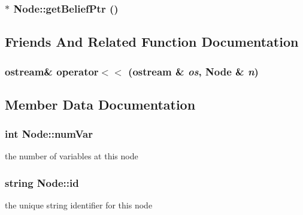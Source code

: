 \subsubsection{$\ast$ Node::getBeliefPtr ()\hspace{0.3cm}{\tt  [inline]}}\label{classNode_f7a5e8b045a32c6468ca6d4f3a9233c7}




\subsection{Friends And Related Function Documentation}
\subsubsection{\setlength{\rightskip}{0pt plus 5cm}ostream\& operator$<$$<$ (ostream \& {\em os}, {\bf Node} \& {\em n})\hspace{0.3cm}{\tt  [friend]}}\label{classNode_c32ccdb39e5e9cd9f0b919638e049adc}




\subsection{Member Data Documentation}
\subsubsection{\setlength{\rightskip}{0pt plus 5cm}int {\bf Node::numVar}\hspace{0.3cm}{\tt  [private]}}\label{classNode_109775531a437cf6f1fa6aa040c8623c}


the number of variables at this node 

\subsubsection{\setlength{\rightskip}{0pt plus 5cm}string {\bf Node::id}\hspace{0.3cm}{\tt  [private]}}\label{classNode_0ac7414e34292f7dfd7f532a69691ca3}


the unique string identifier for this node 

